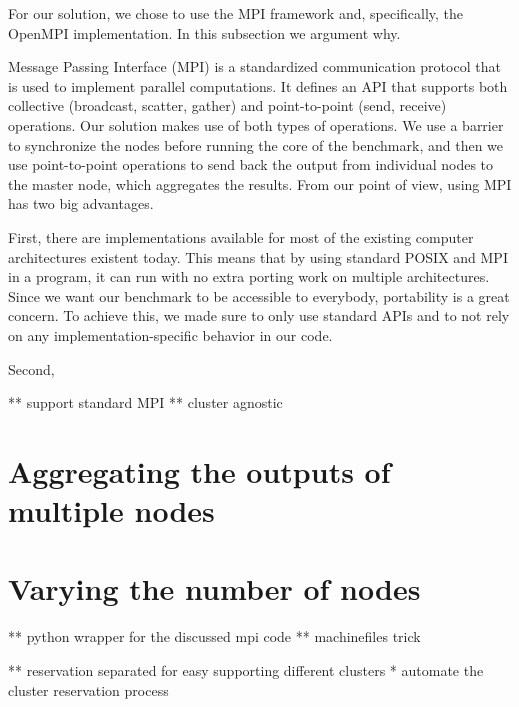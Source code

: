 For our solution, we chose to use the MPI framework and, specifically, the OpenMPI\cite{openmpi} implementation. In this subsection we argument why.

Message Passing Interface (MPI) is a standardized communication protocol that is used to implement parallel computations. It defines an API that supports both collective (broadcast, scatter, gather) and point-to-point (send, receive) operations. Our solution makes use of both types of operations. We use a barrier to synchronize the nodes before running the core of the benchmark, and then we use point-to-point operations to send back the output from individual nodes to the master node, which aggregates the results. From our point of view, using MPI has two big advantages.

First, there are implementations available for most of the existing computer architectures existent today\cite{mpi_implementations}. This means that by using standard POSIX and MPI in a program, it can run with no extra porting work on multiple architectures. Since we want our benchmark to be accessible to everybody, portability is a great concern. To achieve this, we made sure to only use standard APIs and to not rely on any implementation-specific behavior in our code.

Second, 

** support standard MPI
** cluster agnostic


\section{Aggregating the outputs of multiple nodes}




\section{Varying the number of nodes}

** python wrapper for the discussed mpi code
** machinefiles trick


** reservation separated for easy supporting different clusters
* automate the cluster reservation process

